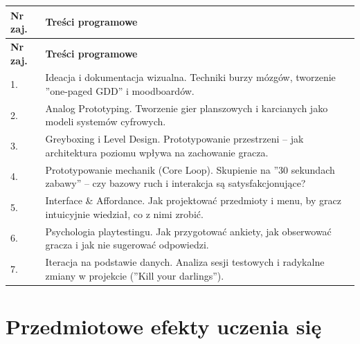 \documentclass[12pt, a4paper]{article}
\newcommand{\thdrule}{\noalign{\global\setlength{\extrarowheight}{0pt}}}
\newcommand{\thdend}{\noalign{\global\setlength{\extrarowheight}{3pt}}}
\begin{document}
{\scriptsize
\begin{longtable}{m{1.5cm}m{14.5cm}}
\thdrule\toprule
\rowcolor{pjatkRed} {\color{white}\textbf{Nr zaj.}} & {\color{white}\textbf{Treści programowe}} \\
\midrule\thdend
\endfirsthead
\thdrule\toprule
\rowcolor{pjatkRed} {\color{white}\textbf{Nr zaj.}} & {\color{white}\textbf{Treści programowe}} \\
\midrule\thdend
\endhead
  \rowcolor{tableRowLight} 1. & Ideacja i dokumentacja wizualna. Techniki burzy mózgów, tworzenie ''one-paged GDD'' i moodboardów. \\
  \rowcolor{tableRowAlt} 2. & Analog Prototyping. Tworzenie gier planszowych i karcianych jako modeli systemów cyfrowych. \\
  \rowcolor{tableRowLight} 3. & Greyboxing i Level Design. Prototypowanie przestrzeni – jak architektura poziomu wpływa na zachowanie gracza. \\
  \rowcolor{tableRowAlt} 4. & Prototypowanie mechanik (Core Loop). Skupienie na ''30 sekundach zabawy'' – czy bazowy ruch i interakcja są satysfakcjonujące? \\
  \rowcolor{tableRowLight} 5. & Interface \& Affordance. Jak projektować przedmioty i menu, by gracz intuicyjnie wiedział, co z nimi zrobić. \\
  \rowcolor{tableRowAlt} 6. & Psychologia playtestingu. Jak przygotować ankiety, jak obserwować gracza i jak nie sugerować odpowiedzi. \\
  \rowcolor{tableRowLight} 7. & Iteracja na podstawie danych. Analiza sesji testowych i radykalne zmiany w projekcie (''Kill your darlings''). \\
\bottomrule
\end{longtable}}

\section{Przedmiotowe efekty uczenia się}
\end{document}
